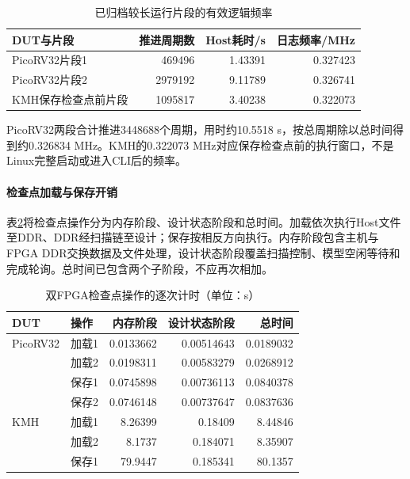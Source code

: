 \begin{table}[htbp]
    \centering
    \caption{已归档较长运行片段的有效逻辑频率}
    \label{tab:midterm-board-frequency}
    \small
    \begin{tabular}{@{}lrrr@{}}
        \toprule
        DUT与片段      & 推进周期数   & Host耗时/s & 日志频率/MHz \\
        \midrule
        PicoRV32片段1 & 469496  & 1.43391  & 0.327423 \\
        PicoRV32片段2 & 2979192 & 9.11789  & 0.326741 \\
        KMH保存检查点前片段 & 1095817 & 3.40238  & 0.322073 \\
        \bottomrule
    \end{tabular}
\end{table}

PicoRV32两段合计推进3448688个周期，用时约10.5518 s，按总周期除以总时间得到约0.326834 MHz。KMH的0.322073 MHz对应保存检查点前的执行窗口，不是Linux完整启动或进入CLI后的频率。


\paragraph{检查点加载与保存开销}

表\ref{tab:midterm-checkpoint-time}将检查点操作分为内存阶段、设计状态阶段和总时间。加载依次执行Host文件至DDR、DDR经扫描链至设计；保存按相反方向执行。内存阶段包含主机与FPGA DDR交换数据及文件处理，设计状态阶段覆盖扫描控制、模型空闲等待和完成轮询。总时间已包含两个子阶段，不应再次相加。

\begin{table}[htbp]
    \centering
    \caption{双FPGA检查点操作的逐次计时（单位：s）}
    \label{tab:midterm-checkpoint-time}
    \small
    \begin{tabular}{@{}llrrr@{}}
        \toprule
        DUT      & 操作  & 内存阶段      & 设计状态阶段     & 总时间       \\
        \midrule
        PicoRV32 & 加载1 & 0.0133662 & 0.00514643 & 0.0189032 \\
                 & 加载2 & 0.0198311 & 0.00583279 & 0.0268912 \\
                 & 保存1 & 0.0745898 & 0.00736113 & 0.0840378 \\
                 & 保存2 & 0.0746148 & 0.00737647 & 0.0837636 \\
        KMH      & 加载1 & 8.26399   & 0.18409    & 8.44846   \\
                 & 加载2 & 8.1737    & 0.184071   & 8.35907   \\
                 & 保存1 & 79.9447   & 0.185341   & 80.1357   \\
        \bottomrule
    \end{tabular}
\end{table}

